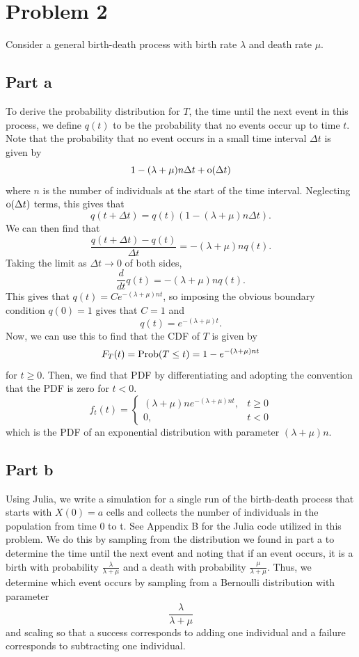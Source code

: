 \documentclass{article}
\begin{document}
\section{Problem 2}
Consider a general birth-death process with birth rate $\lambda$ and death rate $\mu$. 
\subsection{Part a}
To derive the probability distribution for $T$, the time until the
next event in this process, we define $q(t)$ to be the probability that no events occur up to time $t$. Note that the probability that no event occurs in a small time interval $\Delta t$ is given by 
\[
1-(\lambda+\mu)n\Delta t+\operatorname{o}(\Delta t)
\]
where $n$ is the number of individuals at the start of the time interval. Neglecting $\operatorname{o}(\Delta t)$ terms, this gives that
\[
q(t+\Delta t)=q(t)(1-(\lambda+\mu)n\Delta t).
\]
We can then find that 
\[
\frac{q(t+\Delta t)-q(t)}{\Delta t}=-(\lambda+\mu)nq(t).
\]
Taking the limit as $\Delta t\to0$ of both sides,
\[
\frac{d}{dt}q(t)=-(\lambda+\mu)nq(t).
\]
This gives that $q(t)=Ce^{-(\lambda+\mu)nt}$, so imposing the obvious boundary condition $q(0)=1$ gives that $C=1$ and
\[
q(t)=e^{-(\lambda+\mu)t}.
\]
Now, we can use this to find that the CDF of $T$ is given by
\[
F_T(t)=\operatorname{Prob}(T\leq t)=1-e^{-(\lambda+\mu)nt}
\]
for $t\geq0$. Then, we find that PDF by differentiating and adopting the convention that the PDF is zero for $t<0$. 
\[
f_t(t)=\begin{cases}
	(\lambda+\mu)ne^{-(\lambda+\mu)nt}, &t\geq0\\
	0, &t<0
\end{cases}
\]
which is the PDF of an exponential distribution with parameter $(\lambda+\mu)n$. 

\subsection{Part b}
Using Julia, we write a simulation for a single
run of the birth-death process that starts with $X(0) = a$ cells and collects the number of individuals in the population from time 0 to t. See Appendix B for the Julia code utilized in this problem. We do this by sampling from the distribution we found in part a to determine the time until the next event and noting that if an event occurs, it is a birth with probability $\frac{\lambda}{\lambda+\mu}$ and a death with probability $\frac{\mu}{\lambda+\mu}$. Thus, we determine which event occurs by sampling from a Bernoulli distribution with parameter 
\[
\frac{\lambda}{\lambda+\mu}
\]
and scaling so that a success corresponds to adding one individual and a failure corresponds to subtracting one individual. 
\end{document}
